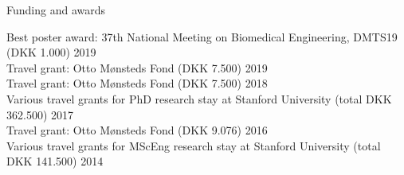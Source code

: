 \documentclass{resume} %
\begin{document}
\begin{rSection}{Funding and awards}
    
    Best poster award: 37th National Meeting on Biomedical Engineering, DMTS19 (DKK 1.000) \hfill {2019} \\
    Travel grant: Otto Mønsteds Fond (DKK 7.500) \hfill {2019} \\
    Travel grant: Otto Mønsteds Fond (DKK 7.500) \hfill {2018} \\ 
    Various travel grants for PhD research stay at Stanford University (total DKK 362.500) \hfill {2017} \\
    Travel grant: Otto Mønsteds Fond (DKK 9.076) \hfill {2016} \\ 
    Various travel grants for MScEng research stay at Stanford University (total DKK 141.500) \hfill {2014} \\
    

    
    

\end{rSection}
\end{document}
